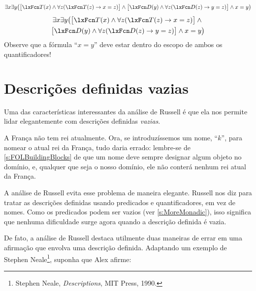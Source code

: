 \ifHTMLtarget
\[
	\exists x \exists y \bigl(\bigl[\atom{T}{x} \eand
	\forall z(\atom{T}{z} \eif x = z)\bigr] \eand
	\bigl[\atom{D}{y} \eand
	\forall z(\atom{D}{z} \eif y = z)\bigr] \eand x = y\bigr)
\]
\else
\begin{multline*}
	\exists x \exists y \bigl(\bigl[\atom{T}{x} \eand
	\forall z(\atom{T}{z} \eif x = z)\bigr] \eand {}\\
	\bigl[\atom{D}{y} \eand
	\forall z(\atom{D}{z} \eif y = z)\bigr] \eand x = y\bigr)
\end{multline*}
\fi
Observe que a fórmula \textquotedblleft $x = y$\textquotedblright{} deve estar dentro do escopo de ambos os quantificadores!

\section{Descrições definidas vazias}

Uma das características interessantes da análise de Russell é que ela nos permite lidar elegantemente com descrições definidas \emph{vazias}.

A França não tem rei atualmente. Ora, se introduzíssemos um nome, \textquotedblleft $k$\textquotedblright{}, para nomear o atual rei da França, tudo daria errado: lembre-se de \cref{s:FOLBuildingBlocks} de que um nome deve sempre designar algum objeto no domínio, e, qualquer que seja o nosso domínio, ele não conterá nenhum rei atual da França.

A análise de Russell evita esse problema de maneira elegante. Russell nos diz para tratar as descrições definidas usando predicados e quantificadores, em vez de nomes. Como os predicados podem ser vazios (ver \cref{s:MoreMonadic}), isso significa que nenhuma dificuldade surge agora quando a descrição definida é vazia.

De fato, a análise de Russell destaca utilmente duas maneiras de errar em uma afirmação que envolva uma descrição definida. Adaptando um exemplo de Stephen Neale\footnote{Stephen Neale, \textit{Descriptions}, MIT Press, 1990.}, suponha que Alex afirme:



